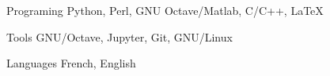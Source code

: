 

\begin{cvskills}

  \cvskill
    {Programing} %
    {Python, Perl, GNU Octave/Matlab, C/C++, LaTeX} %

  \cvskill
    {Tools} %
		{GNU/Octave, Jupyter, Git, GNU/Linux} %

  \cvskill
    {Languages} %
    {French, English} %

\end{cvskills}
